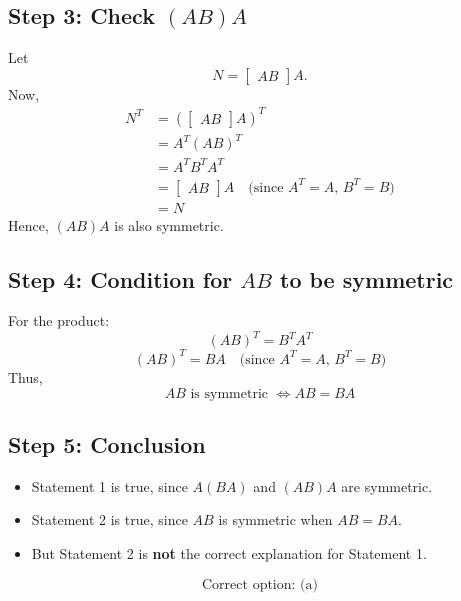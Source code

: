 \documentclass[journal]{IEEEtran}
\begin{document}
\subsection*{Step 3: Check $(AB)A$}
Let 
\[
N = \begin{bmatrix} AB \end{bmatrix} A.
\]  
Now,
\begin{align}
N^T &= \left( \begin{bmatrix} AB \end{bmatrix} A \right)^T \\
&= A^T (AB)^T \\
&= A^T B^T A^T \\
&= \begin{bmatrix} AB \end{bmatrix} A \quad \text{(since $A^T=A$, $B^T=B$)} \\
&= N
\end{align}
Hence, $(AB)A$ is also symmetric.

\subsection*{Step 4: Condition for $AB$ to be symmetric}
For the product:
\[
(AB)^T = B^T A^T
\]
\begin{equation}
(AB)^T = BA \quad \text{(since $A^T=A$, $B^T=B$)}
\end{equation}
Thus,
\begin{equation}
AB \text{ is symmetric } \iff AB = BA
\end{equation}

\subsection*{Step 5: Conclusion}
\begin{itemize}
\item Statement 1 is true, since $A(BA)$ and $(AB)A$ are symmetric.
\item Statement 2 is true, since $AB$ is symmetric when $AB=BA$.
\item But Statement 2 is \textbf{not} the correct explanation for Statement 1.  
\end{itemize}

\[
\boxed{\text{Correct option: (a)}}
\]
\end{document}
